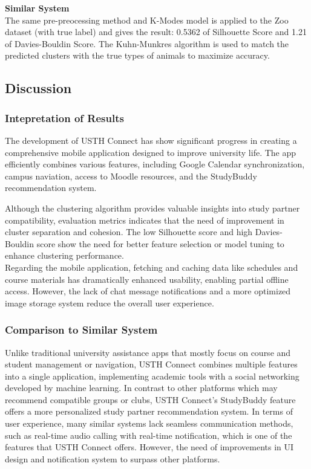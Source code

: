 \documentclass[12pt]{article}
\begin{document}
\textbf{Similar System} \\

The same pre-preocessing method and K-Modes model is applied to the Zoo dataset (with true label) and gives the result: 0.5362 of Silhouette Score and 1.21 of Davies-Bouldin Score. The Kuhn-Munkres\citep{zhu2011efficient} algorithm is used to match the predicted clusters with the true types of animals to maximize accuracy.

\subsection{Discussion}
\subsubsection{Intepretation of Results}
The development of USTH Connect has show significant progress in creating a comprehensive mobile application designed to improve university life.
The app efficiently combines various features, including Google Calendar synchronization, campus naviation, access to Moodle resources, and the StudyBuddy recommendation system.

Although the clustering algorithm provides valuable insights into study partner compatibility, evaluation metrics indicates that the need of improvement in cluster separation and cohesion.
The low Silhouette score and high Davies-Bouldin score show the need for better feature selection or model tuning to enhance clustering performance. \\

Regarding the mobile application, fetching and caching data like schedules and course materials has dramatically enhanced usability, enabling partial offline access.
However, the lack of chat message notifications and a more optimized image storage system reduce the overall user experience.

\subsubsection{Comparison to Similar System}
Unlike traditional university assistance apps that mostly focus on course and student management or navigation, USTH Connect combines multiple features into a single application, implementing academic tools with a social networking developed by machine learning.
In contrast to other platforms which may recommend compatible groups or clubs, USTH Connect's StudyBuddy feature offers a more personalized study partner recommendation system.
In terms of user experience, many similar systems lack seamless communication methods, such as real-time audio calling with real-time notification, which is one of the features that USTH Connect offers.
However, the need of improvements in UI design and notification system to surpass other platforms.
\end{document}
